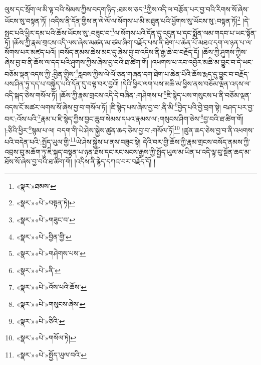 ལུས་དང་སྲོག་ལ་མི་ལྟ་བའི་སེམས་ཀྱིས་བདག་ཉིད་:ཐམས་ཅད་\footnote{«སྣར་»ཐམས་}ཀྱིས་འདི་ལ་བརྩོན་པར་བྱ་བའི་རིགས་སོ་ཞེས་ཡོངས་སུ་བསྟན་ཏོ། །འདིས་ནི་དོན་གྱིས་ན་ལེ་ལོ་ལ་སོགས་པ་མི་མཐུན་པའི་ཕྱོགས་སུ་ཡོངས་སུ་:བསྟན་ཏོ།\footnote{«སྣར་»«པེ་»བསྟན་ཏེ།} །དེ་སྤང་པའི་ཕྱིར་དམ་པའི་ཆོས་ཡོངས་སུ་:བཟུང་བ་\footnote{«སྣར་»«པེ་»གཟུང་བ་}ལ་སོགས་པའི་དོན་དུ་འདུན་པ་དང་སྨོན་ལམ་གདབ་པ་ཡང་སྟོན་ཏོ། །ཆོས་ཀྱི་རྣམ་གྲངས་འདི་ལས་ཞེས་མཚན་མ་ཙམ་ཞིག་བརྗོད་པས་ནི་ཐེག་པ་ཆེན་པོ་མཐའ་དག་ལ་ཉན་པ་ལ་སོགས་པར་མཛད་པའོ། །བསོད་ནམས་ཆེས་མང་དུ་ཞེས་བྱ་བ་འདིས་ནི་རྒྱ་ཆེ་བ་བརྗོད་དོ། །ཆོས་ཀྱི་ཤུགས་ཀྱིས་ཞེས་བྱ་བ་ནི་ཆོས་ལ་དད་པའི་ཤུགས་ཀྱིས་ཞེས་བྱ་བའི་ཐ་ཚིག་གོ། །འཕགས་པ་རབ་འབྱོར་མཆི་མ་བྱུང་བ་དེ་ཡང་བཅོམ་ལྡན་འདས་ཀྱི་:བྱིན་གྱིས་\footnote{«སྣར་»«པེ་»བྱིན་གྱི་}རླབས་ཀྱིས་ལེ་ལོ་ཅན་གཞན་དག་ཐེག་པ་ཆེན་པོའི་ཆོས་རྨད་དུ་བྱུང་བ་བརྗོད་པས་ཤིན་ཏུ་དད་པ་བསྐྱེད་པའི་དོན་དུ་བལྟ་བར་བྱའོ། །དེའི་ཕྱིར་ལག་པས་མཆི་མ་ཕྱིས་ནས་བཅོམ་ལྡན་འདས་ལ་འདི་སྐད་ཅེས་གསོལ་ཏོ། །ཆོས་ཀྱི་རྣམ་གྲངས་འདི་དེ་བཞིན་:གཤེགས་པ་\footnote{«སྣར་»«པེ་»གཤེགས་པས་}ཇི་སྙེད་པས་གསུངས་པ་ནི་བཅོམ་ལྡན་འདས་ངོ་མཚར་ལགས་སོ་ཞེས་བྱ་བ་གསོལ་ཏོ། །ཇི་སྙེད་པས་ཞེས་བྱ་བ་:ནི་མི་\footnote{«སྣར་»«པེ་»ནི་}བྱེད་པའི་བྱེ་བྲག་སྟེ། བཤད་པར་བྱ་བར་:འོས་པའི་\footnote{«སྣར་»«པེ་»འོས་པའི་ཆོས་}རྣམ་པ་ཇི་སྙེད་ཀྱིས་བྱང་ཆུབ་སེམས་དཔའ་རྣམས་ལ་:གསུངས་ཤིག་ཅེས་\footnote{«སྣར་»«པེ་»གསུངས་ཞེས་}བྱ་བའི་ཐ་ཚིག་གོ། །:ཅིའི་ཕྱིར་\footnote{«སྣར་»«པེ་»ཅིའི་}སྙམ་པ་ལ། བདག་གི་ཡེ་ཤེས་སྐྱེས་ཚུན་ཆད་ཅེས་བྱ་བ་:གསོལ་ཏོ།\footnote{«སྣར་»«པེ་»གསོལ་ཏེ།} །ཚུན་ཆད་ཅེས་བྱ་བ་ནི་འཕགས་པའི་བདེན་པའི་:སྤྱོད་ཡུལ་གྱི་\footnote{«སྣར་»«པེ་»སྤྱོད་ཡུལ་བའི་}ཡེ་ཤེས་སྐྱེས་པ་ནས་བཟུང་སྟེ། དེའི་བར་གྱི་ཆོས་ཀྱི་རྣམ་གྲངས་བསོད་ནམས་ཀྱི་འབྲས་བུ་མཆོག་ཏུ་ཇི་སྐད་བསྟན་པ་ཉན་ཐོས་དང་རང་སངས་རྒྱས་ཀྱི་སྤྱོད་ཡུལ་མ་ཡིན་པ་འདི་ལྟ་བུ་སྔོན་ཆད་མ་ཐོས་སོ་ཞེས་བྱ་བའི་ཐ་ཚིག་གོ། །འདིས་ནི་རྙེད་དཀའ་བར་བརྗོད་དོ། །
